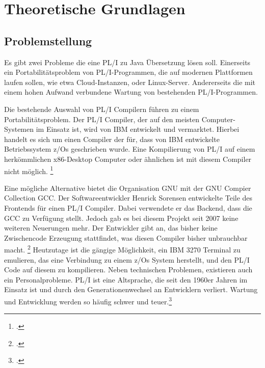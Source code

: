




\section{Theoretische Grundlagen}
\subsection{Problemstellung}
	
Es gibt zwei Probleme die eine PL/I zu Java Übersetzung lösen soll. 
Einerseits ein Portabilitätsproblem von PL/I-Programmen, die auf modernen Plattformen laufen sollen, wie etwa Cloud-Instanzen, oder Linux-Server. Andererseits die mit einem hohen Aufwand verbundene Wartung von bestehenden PL/I-Programmen. 
	
Die bestehende Auswahl von PL/I Compilern führen zu einem Portabilitätsproblem. Der PL/I Compiler, der auf den meisten Computer-Systemen im Einsatz ist, wird von IBM entwickelt und vermarktet. Hierbei handelt es sich um einen Compiler der für, dass von IBM entwickelte Betriebssystem z/Os geschrieben wurde. Eine Kompilierung von PL/I auf einem herkömmlichen x86-Desktop Computer oder ähnlichen ist mit diesem Compiler nicht möglich. \footcite[Vgl. ][]{plicomp}


Eine mögliche Alternative bietet die Organisation GNU mit der GNU Compier Collection \ac{GCC}. Der Softwareentwickler Henrick Sorensen entwickelte Teile des Frontends für einen PL/I Compiler. Dabei verwendete er das Backend, dass die \ac{GCC} zu Verfügung stellt. Jedoch gab es bei diesem Projekt seit 2007 keine weiteren Neuerungen mehr. Der Entwickler gibt an, das bisher keine Zwischencode Erzeugung stattfindet, was diesen Compiler bisher unbrauchbar macht. \footcite[Vgl. ][]{pligcc} 
Heutzutage ist die gängige Möglichkeit, ein IBM 3270 Terminal zu emulieren, das eine Verbindung zu einem z/Os System herstellt, und den PL/I Code auf diesem zu kompilieren.
Neben technischen Problemen, existieren auch ein Personalprobleme. PL/I ist eine Altsprache, die seit den 1960er Jahren im Einsatz ist und durch den Generationenwechsel an Entwicklern verliert. Wartung und Entwicklung werden so häufig schwer und teuer.\footcite[Vgl. ][S. 227ff.]{histopli} 


